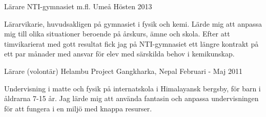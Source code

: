 \begin{cventries}

\cventry
{L{\"a}rare} %
{NTI-gymnasiet m.fl.} %
{Ume{\aa}} %
{H{\"o}sten 2013} %
{ %
\begin{cvitems}
\item {L{\"a}rarvikarie, huvudsakligen p{\aa} gymnasiet i fysik och kemi. L{\"a}rde mig att anpassa mig till olika situationer beroende p{\aa} {\aa}rskurs, {\"a}mne och skola. 
			Efter att timvikarierat med gott resultat fick jag p{\aa} NTI-gymnasiet ett l{\"a}ngre kontrakt p{\aa} ett par m{\aa}nader med ansvar f{\"o}r elev med s{\"a}rskilda behov i kemikunskap. }
\end{cvitems}
}

\cventry
{L{\"a}rare (volont{\"a}r)} %
{Helambu Project} %
{Gangkharka, Nepal} %
{Februari - Maj 2011} %
{ %
\begin{cvitems}
\item {Undervisning i matte och fysik p{\aa} internatskola i Himalayansk bergsby, f{\"o}r barn i {\aa}ldrarna 7-15 {\aa}r. 
			Jag l{\"a}rde mig att anv{\"a}nda fantasin och anpassa undervisningen f{\"o}r att fungera i en milj{\"o} med knappa resurser.}
\end{cvitems}
}

\end{cventries}